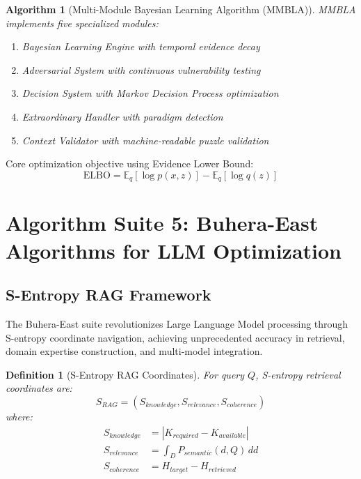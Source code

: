 \documentclass[12pt,a4paper]{article}
\newtheorem{definition}[theorem]{Definition}
\newtheorem{algorithm_def}[theorem]{Algorithm}
\begin{document}
\begin{algorithm}
\begin{algorithmic}[1]
\begin{algorithm_def}[Multi-Module Bayesian Learning Algorithm (MMBLA)]
MMBLA implements five specialized modules:
\begin{enumerate}
\item Bayesian Learning Engine with temporal evidence decay
\item Adversarial System with continuous vulnerability testing
\item Decision System with Markov Decision Process optimization
\item Extraordinary Handler with paradigm detection
\item Context Validator with machine-readable puzzle validation
\end{enumerate}
\end{algorithm_def}

Core optimization objective using Evidence Lower Bound:
\begin{equation}
\text{ELBO} = \mathbb{E}_q[\log p(x,z)] - \mathbb{E}_q[\log q(z)]
\end{equation}

\section{Algorithm Suite 5: Buhera-East Algorithms for LLM Optimization}

\subsection{S-Entropy RAG Framework}

The Buhera-East suite revolutionizes Large Language Model processing through S-entropy coordinate navigation, achieving unprecedented accuracy in retrieval, domain expertise construction, and multi-model integration.

\begin{definition}[S-Entropy RAG Coordinates]
For query $Q$, S-entropy retrieval coordinates are:
\begin{equation}
S_{RAG} = (S_{knowledge}, S_{relevance}, S_{coherence})
\end{equation}
where:
\begin{align}
S_{knowledge} &= |K_{required} - K_{available}| \\
S_{relevance} &= \int_D P_{semantic}(d, Q) \, dd \\
S_{coherence} &= H_{target} - H_{retrieved}
\end{align}
\end{definition}


\end{algorithmic}
\end{algorithm}
\end{document}
